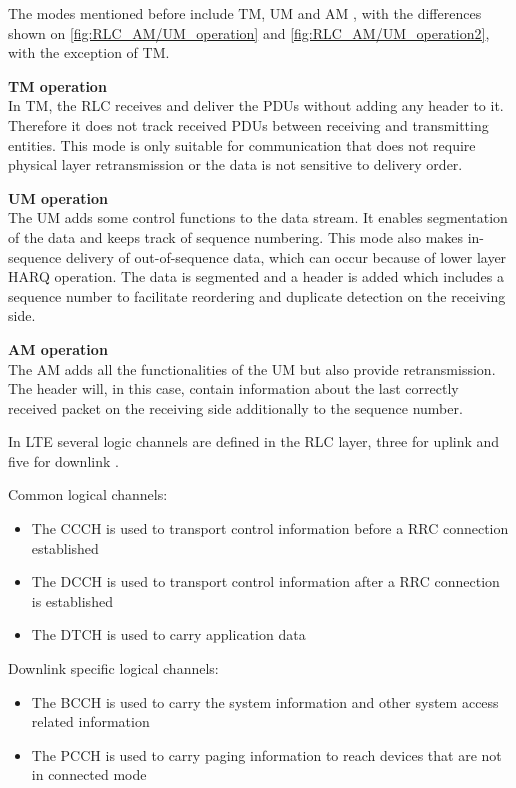 The modes mentioned before include \gls{TM}, \gls{UM} and \gls{AM} \citep[ch. 6.4]{book_LTE_for_UMTS}, with the differences shown on \autoref{fig:RLC_AM/UM_operation} and \autoref{fig:RLC_AM/UM_operation2}, with the exception of TM.

\textbf{\gls{TM} operation} \\
In \gls{TM}, the \gls{RLC} receives and deliver the \gls{PDU}s without adding any header to it. Therefore it does not track received \gls{PDU}s between receiving and transmitting entities. This mode is only suitable for communication that does not require physical layer retransmission or the data is not sensitive to delivery order.

\textbf{\gls{UM} operation} \\
The \gls{UM} adds some control functions to the data stream. It enables segmentation of the data and keeps track of sequence numbering. This mode also makes in-sequence delivery of out-of-sequence data, which can occur because of lower layer \gls{HARQ} operation. The data is segmented and a header is added which includes a sequence number to facilitate reordering and duplicate detection on the receiving side.

\textbf{\gls{AM} operation} \\
The \gls{AM} adds all the functionalities of the \gls{UM} but also provide retransmission. The header will, in this case, contain information about the last correctly received packet on the receiving side additionally to the sequence number. 

In \gls{LTE} several logic channels are defined in the \gls{RLC} layer, three for uplink and five for downlink \citep[ch. 6.3]{book_LTE_for_UMTS}. 

Common logical channels:
\begin{itemize}
\item The \gls{CCCH} is used to transport control information before a \gls{RRC} connection established
\item The \gls{DCCH} is used to transport control information after a \gls{RRC} connection is established
\item The \gls{DTCH} is used to carry application data
\end{itemize}
Downlink specific logical channels:
\begin{itemize}
\item The \gls{BCCH} is used to carry the system information and other system access related information
\item The \gls{PCCH} is used to carry paging information to reach devices that are not in connected mode
\end{itemize}

